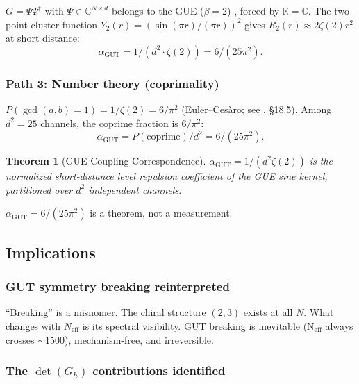 \documentclass[12pt]{article}
\newtheorem{theorem}{Theorem}[section]
\theoremstyle{remark}
\theoremstyle{definition}
\newcommand{\CC}{\mathbb{C}}
\newcommand{\agut}{\alpha_{\mathrm{GUT}}}
\begin{document}
$G = \Psi\Psi^\dagger$ with $\Psi \in \CC^{N \times d}$ belongs
to the GUE ($\beta = 2$) \cite{Mehta}, forced by
$\mathbb{K} = \CC$. The two-point cluster function $Y_2(r) = (\sin(\pi r)/(\pi r))^2$ gives $R_2(r) \approx 2\zeta(2)r^2$ at short distance:
\begin{equation}
\agut = 1/(d^2 \cdot \zeta(2)) = 6/(25\pi^2).
\end{equation}

\subsubsection{Path 3: Number theory (coprimality)}

$P(\gcd(a,b) = 1) = 1/\zeta(2) = 6/\pi^2$
(Euler--Ces\`aro; see \cite{Hardy-Wright}, \S18.5). Among $d^2 = 25$ channels, the coprime fraction is $6/\pi^2$:
\begin{equation}
\agut = P(\text{coprime})/d^2 = 6/(25\pi^2).
\end{equation}

\begin{theorem}[GUE-Coupling Correspondence]
$\agut = 1/(d^2\zeta(2))$ is the normalized short-distance level repulsion coefficient of the GUE sine kernel, partitioned over $d^2$ independent channels.
\end{theorem}

$\agut = 6/(25\pi^2)$ is a theorem, not a measurement.

\subsection{Implications}

\subsubsection{GUT symmetry breaking reinterpreted}

``Breaking'' is a misnomer. The chiral structure $(2,3)$ exists at all $N$. What changes with $N_\text{eff}$ is its spectral visibility. GUT breaking is inevitable (N$_\text{eff}$ always crosses $\sim$1500), mechanism-free, and irreversible.

\subsubsection{The $\det(G_h)$ contributions identified}
\end{document}
